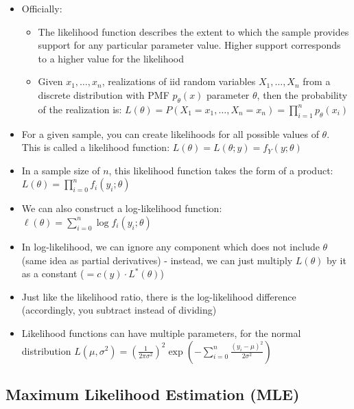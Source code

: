 \documentclass{article}
\begin{document}
\begin{itemize}
    \item Officially:
    \begin{itemize}
        \item The likelihood function describes the extent to which the sample provides support for any particular parameter value. Higher support corresponds to a higher value for the likelihood
        \item Given $x_1,\dots,x_n$, realizations of iid random variables $X_1,\dots,X_n$ from a discrete distribution with PMF $p_\theta(x)$ parameter $\theta$, then the probability of the realization is: $L(\theta)=P(X_1=x_1,\dots,X_n=x_n)=\prod_{i=1}^n p_\theta(x_i)$
    \end{itemize}
    \item For a given sample, you can create likelihoods for all possible values of $\theta$. This is called a likelihood function: $L(\theta)=L(\theta;y)=f_Y(y;\theta)$
    \item In a sample size of $n$, this likelihood function takes the form of a product: $L(\theta)=\prod_{i=0}^{n} f_i(y_i;\theta)$
    \item We can also construct a log-likelihood function: $\ell(\theta)=\sum_{i=0}^{n} \log f_i(y_i;\theta)$
    \item In log-likelihood, we can ignore any component which does not include $\theta$ (same idea as partial derivatives) - instead, we can just multiply $L(\theta)$ by it as a constant ($=c(y) \cdot L^*(\theta)$)
    \item Just like the likelihood ratio, there is the log-likelihood difference (accordingly, you subtract instead of dividing)
    \item Likelihood functions can have multiple parameters, for the normal distribution $L(\mu, \sigma^2)=(\frac{1}{2 \pi \sigma^2})^2 \exp (-\sum_{i=0}^{n}\frac{(y_i-\mu)^2}{2 \sigma^2})$
\end{itemize}

\subsection{Maximum Likelihood Estimation (MLE)}
\end{document}
